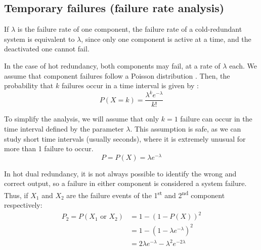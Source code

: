 \documentclass[a4paper,nobib]{tufte-book}
\begin{document}
\subsection{Temporary failures (failure rate analysis)}

If \( \lambda \) is the failure rate of one component, the failure rate of a cold-redundant system is equivalent to \( \lambda \), since only one component is active at a time, and the deactivated one cannot fail.


In the case of hot redundancy, both components may fail, at a rate of \( \lambda \) each. We assume that component failures follow a Poisson distribution \autocite[35]{birolini_reliability_engineering_2004}. Then, the probability that \(k\) failures occur in a time interval is given by \autocite[60]{yates_probability_stochastic_2014}:
	\begin{equation}
	P(X=k) = \frac{\lambda^ke^{-\lambda}}{k!}
	\end{equation}
	

To simplify the analysis, we will assume that only \(k = 1\) failure can occur in the time interval defined by the parameter \( \lambda \). This assumption is safe, as we can study short time intervals (usually seconds), where it is extremely unusual for more than 1 failure to occur.
	\begin{equation}
	P = P(X) = \lambda e^{-\lambda}
	\end{equation}
	
In hot dual redundancy, it is not always possible to identify the wrong and correct output, so a failure in either component is considered a system failure. Thus, if \(X_1\) and \(X_2\) are the failure events of the 1\textsuperscript{st} and 2\textsuperscript{nd} component respectively:
\begin{align}
P_2 = P(X_1\text{ or }X_2) &= 1 - (1 - P(X))^2 \nonumber\\
&= 1 - \left(1 - \lambda e^{-\lambda} \right)^2 \nonumber\\
&=  2 \lambda e^{-\lambda} -\lambda^2e^{-2\lambda} \label{eq:lambda}
\end{align}
	
\end{document}
